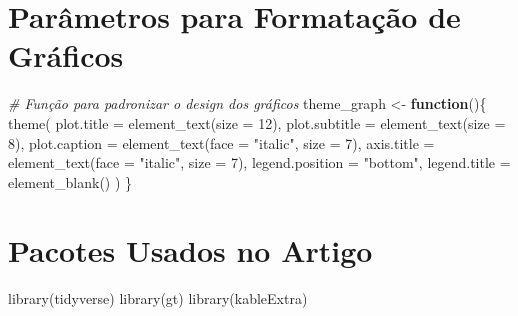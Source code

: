 \documentclass[
  12pt,
  a4paper,
]{article}
\newenvironment{Shaded}{\begin{snugshade}}{\end{snugshade}}
\newcommand{\AttributeTok}[1]{\textcolor[rgb]{0.77,0.63,0.00}{#1}}
\newcommand{\CommentTok}[1]{\textcolor[rgb]{0.56,0.35,0.01}{\textit{#1}}}
\newcommand{\ControlFlowTok}[1]{\textcolor[rgb]{0.13,0.29,0.53}{\textbf{#1}}}
\newcommand{\DecValTok}[1]{\textcolor[rgb]{0.00,0.00,0.81}{#1}}
\newcommand{\FunctionTok}[1]{\textcolor[rgb]{0.00,0.00,0.00}{#1}}
\newcommand{\NormalTok}[1]{#1}
\newcommand{\OtherTok}[1]{\textcolor[rgb]{0.56,0.35,0.01}{#1}}
\newcommand{\SpecialCharTok}[1]{\textcolor[rgb]{0.00,0.00,0.00}{#1}}
\newcommand{\StringTok}[1]{\textcolor[rgb]{0.31,0.60,0.02}{#1}}
\begin{document}
\begin{Shaded}
\end{Shaded}

\hypertarget{paruxe2metros-para-formatauxe7uxe3o-de-gruxe1ficos}{%
\section{Parâmetros para Formatação de Gráficos}\label{paruxe2metros-para-formatauxe7uxe3o-de-gruxe1ficos}}

\begin{Shaded}
\begin{Highlighting}[]
\CommentTok{\# Função para padronizar o design dos gráficos}
\NormalTok{theme\_graph }\OtherTok{\textless{}{-}} \ControlFlowTok{function}\NormalTok{()\{}
  \FunctionTok{theme}\NormalTok{(}
    \AttributeTok{plot.title =} \FunctionTok{element\_text}\NormalTok{(}\AttributeTok{size =} \DecValTok{12}\NormalTok{),}
    \AttributeTok{plot.subtitle =} \FunctionTok{element\_text}\NormalTok{(}\AttributeTok{size =} \DecValTok{8}\NormalTok{),}
    \AttributeTok{plot.caption =} \FunctionTok{element\_text}\NormalTok{(}\AttributeTok{face =} \StringTok{"italic"}\NormalTok{, }\AttributeTok{size =} \DecValTok{7}\NormalTok{),}
    \AttributeTok{axis.title =} \FunctionTok{element\_text}\NormalTok{(}\AttributeTok{face =} \StringTok{"italic"}\NormalTok{, }\AttributeTok{size =} \DecValTok{7}\NormalTok{),}
    \AttributeTok{legend.position =} \StringTok{"bottom"}\NormalTok{,}
    \AttributeTok{legend.title =} \FunctionTok{element\_blank}\NormalTok{()}
\NormalTok{  )}
\NormalTok{\}}
\end{Highlighting}
\end{Shaded}

\hypertarget{pacotes-usados-no-artigo}{%
\section{Pacotes Usados no Artigo}\label{pacotes-usados-no-artigo}}

\begin{Shaded}
\begin{Highlighting}[]
\FunctionTok{library}\NormalTok{(tidyverse)}
\FunctionTok{library}\NormalTok{(gt)}
\FunctionTok{library}\NormalTok{(kableExtra)}
\end{Highlighting}
\end{Shaded}
\end{document}
